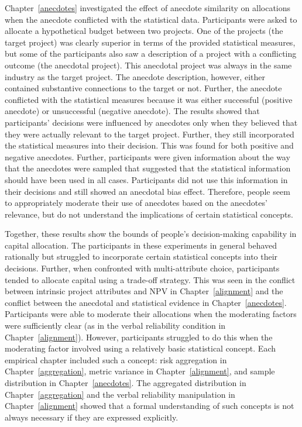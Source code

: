 \documentclass[a4paper, nobind, dvipsnames]{templates/ociamthesis}
\theoremstyle{definition}
\theoremstyle{definition}
\theoremstyle{definition}
\theoremstyle{definition}
\theoremstyle{remark}
\begin{document}
Chapter~\ref{anecdotes} investigated the effect of anecdote similarity on
allocations when the anecdote conflicted with the statistical data. Participants
were asked to allocate a hypothetical budget between two projects. One of the
projects (the target project) was clearly superior in terms of the provided
statistical measures, but some of the participants also saw a description of a
project with a conflicting outcome (the anecdotal project). This anecdotal
project was always in the same industry as the target project. The anecdote
description, however, either contained substantive connections to the target or
not. Further, the anecdote conflicted with the statistical measures because it
was either successful (positive anecdote) or unsuccessful (negative anecdote).
The results showed that participants' decisions were influenced by anecdotes
only when they believed that they were actually relevant to the target project.
Further, they still incorporated the statistical measures into their decision.
This was found for both positive and negative anecdotes. Further, participants
were given information about the way that the anecdotes were sampled that
suggested that the statistical information should have been used in all cases.
Participants did not use this information in their decisions and still showed an
anecdotal bias effect. Therefore, people seem to appropriately moderate their
use of anecdotes based on the anecdotes' relevance, but do not understand the
implications of certain statistical concepts.

Together, these results show the bounds of people's decision-making capability
in capital allocation. The participants in these experiments in general behaved
rationally but struggled to incorporate certain statistical concepts into their
decisions. Further, when confronted with multi-attribute choice, participants
tended to allocate capital using a trade-off strategy. This was seen in the
conflict between intrinsic project attributes and NPV in
Chapter~\ref{alignment} and the conflict between the anecdotal and statistical
evidence in Chapter~\ref{anecdotes}. Participants were able to moderate their
allocations when the moderating factors were sufficiently clear (as in the
verbal reliability condition in Chapter~\ref{alignment}). However, participants
struggled to do this when the moderating factor involved using a relatively
basic statistical concept. Each empirical chapter included such a concept: risk
aggregation in Chapter~\ref{aggregation}, metric variance in
Chapter~\ref{alignment}, and sample distribution in Chapter~\ref{anecdotes}.
The aggregated distribution in Chapter~\ref{aggregation} and the verbal
reliability manipulation in Chapter~\ref{alignment} showed that a formal
understanding of such concepts is not always necessary if they are expressed
explicitly.
\end{document}
